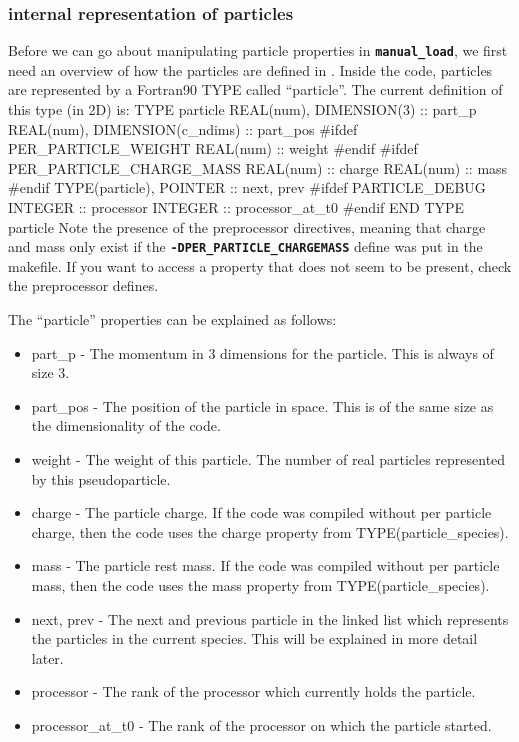 \documentclass[12pt,a4paper]{article}
\newcommand{\inlinecode}[1]{{\color{warwickred} \bf\texttt{#1}}}
\newcommand{\EPOCH}{{\color{warwickdark}\fontfamily{phv}\selectfont{EPOCH}}}
\newenvironment{boxverbatim}{\lboxverbatim{none}}{\endlboxverbatim}
\begin{document}
\subsubsection{{\EPOCH} internal representation of particles}
\label{sec:partrep}
Before we can go about manipulating particle properties in
\inlinecode{manual\_load}, we first need an overview of how the particles
are defined in {\EPOCH}.
Inside the code, particles are represented by a Fortran90 TYPE called
``particle''. The current definition of this type (in 2D) is:
\begin{boxverbatim}
  TYPE particle
    REAL(num), DIMENSION(3) :: part_p
    REAL(num), DIMENSION(c_ndims) :: part_pos
#ifdef PER_PARTICLE_WEIGHT
    REAL(num) :: weight
#endif
#ifdef PER_PARTICLE_CHARGE_MASS
    REAL(num) :: charge
    REAL(num) :: mass
#endif
    TYPE(particle), POINTER :: next, prev
#ifdef PARTICLE_DEBUG
    INTEGER :: processor
    INTEGER :: processor_at_t0
#endif
  END TYPE particle
\end{boxverbatim}
Note the presence of the preprocessor directives, meaning that charge and mass
only exist if the \inlinecode{-DPER\_PARTICLE\_CHARGEMASS} define was put in
the makefile. If you want to access a property that does not seem to be
present, check the preprocessor defines.

The ``particle'' properties can be explained as follows:
\begin{itemize}
\item part\_p - The momentum in 3 dimensions for the particle. This is always
  of size 3.
\item part\_pos - The position of the particle in space. This is of the same
  size as the dimensionality of the code.
\item weight - The weight of this particle. The number of real particles
  represented by this pseudoparticle.
\item charge - The particle charge. If the code was compiled without per
  particle charge, then the code uses the charge property from
  TYPE(particle\_species).
\item mass - The particle rest mass. If the code was compiled without per
  particle mass, then the code uses the mass property from
  TYPE(particle\_species).
\item next, prev - The next and previous particle in the linked list which
  represents the particles in the current species. This will be explained in
  more detail later.
\item processor - The rank of the processor which currently holds the
  particle.
\item processor\_at\_t0 - The rank of the processor on which the particle
  started.
\end{itemize}
\end{document}
